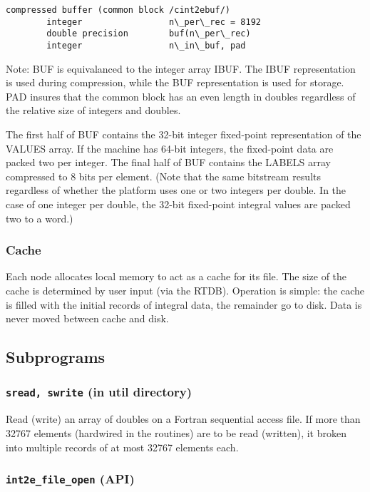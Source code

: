 \begin{verbatim}
compressed buffer (common block /cint2ebuf/)
        integer                 n\_per\_rec = 8192
        double precision        buf(n\_per\_rec)
        integer                 n\_in\_buf, pad
\end{verbatim}

Note: BUF is equivalanced to the integer array IBUF.  The IBUF
representation is used during compression, while the BUF
representation is used for storage.  PAD insures that the common block
has an even length in doubles regardless of the relative size of
integers and doubles.

The first half of BUF contains the 32-bit integer fixed-point
representation of the VALUES array.  If the machine has 64-bit
integers, the fixed-point data are packed two per integer.  The final
half of BUF contains the LABELS array compressed to 8 bits per
element. (Note that the same bitstream results regardless of whether
the platform uses one or two integers per double. In the case of one
integer per double, the 32-bit fixed-point integral values are packed
two to a word.)

\subsubsection{Cache}

Each node allocates local memory to act as a cache for its file.  The
size of the cache is determined by user input (via the RTDB).
Operation is simple:  the cache is filled with the initial records of
integral data, the remainder go to disk.  Data is never moved between
cache and disk.

\subsection{Subprograms}

\subsubsection{{\tt sread, swrite} (in util directory)}


Read (write) an array of doubles on a Fortran sequential access file.
If more than 32767 elements (hardwired in the routines) are to be read
(written), it broken into multiple records of at most 32767 elements
each.

\subsubsection{{\tt int2e\_file\_open} (API)}


